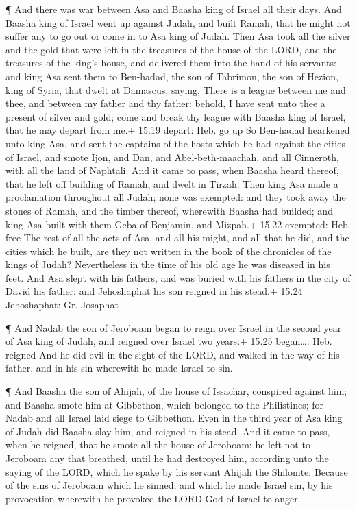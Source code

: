  ¶ And there was war between Asa and Baasha king of Israel
all their days.  And Baasha king of Israel went up against
Judah, and built Ramah, that he might not suffer any to go out or come
in to Asa king of Judah.  Then Asa took all the silver and
the gold that were left in the treasures of the house of the LORD, and
the treasures of the king's house, and delivered them into the hand of
his servants: and king Asa sent them to Ben-hadad, the son of Tabrimon,
the son of Hezion, king of Syria, that dwelt at Damascus, saying,
 There is a league between me and thee, and between my
father and thy father: behold, I have sent unto thee a present of silver
and gold; come and break thy league with Baasha king of Israel, that he
may depart from me.+ 15.19 depart: Heb. go up  So Ben-hadad
hearkened unto king Asa, and sent the captains of the hosts which he had
against the cities of Israel, and smote Ijon, and Dan, and
Abel-beth-maachah, and all Cinneroth, with all the land of Naphtali.
 And it came to pass, when Baasha heard thereof, that he
left off building of Ramah, and dwelt in Tirzah.  Then king
Asa made a proclamation throughout all Judah; none was exempted: and
they took away the stones of Ramah, and the timber thereof, wherewith
Baasha had builded; and king Asa built with them Geba of Benjamin, and
Mizpah.+ 15.22 exempted: Heb. free  The rest of all the
acts of Asa, and all his might, and all that he did, and the cities
which he built, are they not written in the book of the chronicles of
the kings of Judah? Nevertheless in the time of his old age he was
diseased in his feet.  And Asa slept with his fathers, and
was buried with his fathers in the city of David his father: and
Jehoshaphat his son reigned in his stead.+ 15.24 Jehoshaphat: Gr.
Josaphat

 ¶ And Nadab the son of Jeroboam began to reign over Israel
in the second year of Asa king of Judah, and reigned over Israel two
years.+ 15.25 began\ldots: Heb. reigned  And he did evil in
the sight of the LORD, and walked in the way of his father, and in his
sin wherewith he made Israel to sin.

 ¶ And Baasha the son of Ahijah, of the house of Issachar,
conspired against him; and Baasha smote him at Gibbethon, which belonged
to the Philistines; for Nadab and all Israel laid siege to Gibbethon.
 Even in the third year of Asa king of Judah did Baasha
slay him, and reigned in his stead.  And it came to pass,
when he reigned, that he smote all the house of Jeroboam; he left not to
Jeroboam any that breathed, until he had destroyed him, according unto
the saying of the LORD, which he spake by his servant Ahijah the
Shilonite:  Because of the sins of Jeroboam which he
sinned, and which he made Israel sin, by his provocation wherewith he
provoked the LORD God of Israel to anger.

